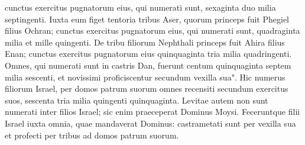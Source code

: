 \begin{biblechapter}
\verse cunctus exercitus pugnatorum eius, qui numerati sunt, sexaginta duo milia septingenti. 
\verse Iuxta eum figet tentoria tribus Aser, quorum princeps fuit Phegiel filius Ochran; 
\verse cunctus exercitus pugnatorum eius, qui numerati sunt, quadraginta milia et mille quingenti. 
\verse De tribu filiorum Nephthali princeps fuit Ahira filius Enan; 
\verse cunctus exercitus pugnatorum eius quinquaginta tria milia quadringenti. 
\verse Omnes, qui numerati sunt in castris Dan, fuerunt centum quinquaginta septem milia sescenti, et novissimi proficiscentur secundum vexilla sua". 
\verse Hic numerus filiorum Israel, per domos patrum suorum omnes recensiti secundum exercitus suos, sescenta tria milia quingenti quinquaginta. 
\verse Levitae autem non sunt numerati inter filios Israel; sic enim praeceperat Dominus Moysi. 
\verse Feceruntque filii Israel iuxta omnia, quae mandaverat Dominus: castrametati sunt per vexilla sua et profecti per tribus ad domos patrum suorum. 
\end{biblechapter}

